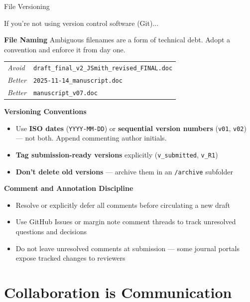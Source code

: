 \documentclass{beamer}
\begin{document}
\begin{frame}{File Versioning}

  \footnotesize

  If you're not using version control software (Git)...

  \medskip
  \textbf{File Naming}
  Ambiguous filenames are a form of technical debt.
  Adopt a convention and enforce it from day one.

  \smallskip
  \begin{center}
  {\scriptsize
  \begin{tabular}{@{}lp{8.5cm}@{}}
    \textit{Avoid}  & \texttt{draft\_final\_v2\_JSmith\_revised\_FINAL.doc} \\
    \textit{Better} & \texttt{2025-11-14\_manuscript.doc} \\
        \textit{Better} & \texttt{manuscript\_v07.doc} \\
  \end{tabular}
  }
  \end{center}

  \medskip
  \textbf{Versioning Conventions}
  \begin{itemize}
    \item Use \textbf{ISO dates} (\texttt{YYYY-MM-DD}) or
      \textbf{sequential version numbers} (\texttt{v01}, \texttt{v02})
      --- not both.  Append commenting author initials.
    \item \textbf{Tag submission-ready versions} explicitly
      (\texttt{v\_submitted}, \texttt{v\_R1})
    \item \textbf{Don't delete old versions} --- archive them in
      an \texttt{/archive} subfolder
  \end{itemize}

  \medskip
  \textbf{Comment and Annotation Discipline}
  \begin{itemize}
    \item Resolve or explicitly defer all comments before
      circulating a new draft
    \item Use GitHub Issues or margin note comment threads to track
      unresolved questions and decisions
    \item Do not leave unresolved comments at submission ---
      some journal portals expose tracked changes to reviewers
  \end{itemize}

\end{frame}


\section{Collaboration is Communication}
\end{document}
